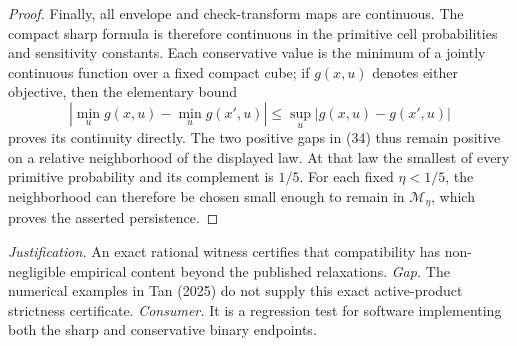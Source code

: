 \documentclass{article}
\begin{document}
\begin{proof}
Finally, all envelope and check-transform maps are continuous.  The
compact sharp formula is therefore continuous in the primitive cell
probabilities and sensitivity constants.  Each conservative value is
the minimum of a jointly continuous function over a fixed compact cube;
if \(g(x,u)\) denotes either objective, then the elementary bound
\[
 \left|\min_u g(x,u)-\min_u g(x',u)\right|
 \leq\sup_u|g(x,u)-g(x',u)|
\]
proves its continuity directly.  The two positive gaps in (34) thus
remain positive on a relative neighborhood of the displayed law.  At
that law the smallest of every primitive probability and its complement
is \(1/5\).  For each fixed \(\eta<1/5\), the neighborhood can therefore
be chosen small enough to remain in \(\mathcal M_\eta\), which proves
the asserted persistence.
\end{proof}
\par\smallskip\noindent \textit{Justification.} An exact rational witness certifies that compatibility has non-negligible empirical content beyond the published relaxations. \textit{Gap.} The numerical examples in Tan (2025) do not supply this exact active-product strictness certificate. \textit{Consumer.} It is a regression test for software implementing both the sharp and conservative binary endpoints.
\end{document}
